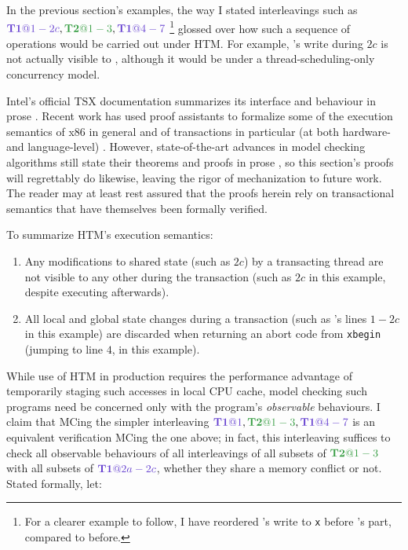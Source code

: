 In the previous section's examples,
the way I stated interleavings such as $\tiat{1-2c}, \tjat{1-3}, \tiat{4-7}$%
\footnote{For a clearer example to follow, I have reordered \ti's write to {\tt x} before \tj's part, compared to before.}
glossed over
how such a sequence of operations would be carried out under HTM.
For example, \ti's write during $2c$ is not actually visible to \tj,
although it would be under a thread-scheduling-only concurrency model.

Intel's official TSX documentation summarizes its interface and behaviour in prose \cite{intel-tsx-overview}.
Recent work has used proof assistants to formalize some of the execution semantics
of x86 in general \cite{x86-semantics}
and of transactions in particular (at both hardware- and language-level) \cite{relaxed-transactions-pldi}.
However, state-of-the-art advances in model checking algorithms
still state their theorems and proofs in prose \cite{bpor,optimal-dpor,tsopso,satcheck,mcr,quicksand,rcmc},
so this section's proofs will regrettably do likewise,
leaving the rigor of mechanization to future work.
The reader may at least rest assured that the proofs herein
rely on transactional semantics that have themselves been formally verified.

To summarize HTM's execution semantics:

\begin{enumerate}
	\item Any modifications to shared state (such as $2c$) by a transacting thread
		are not visible to any other during the transaction
		(such as $2c$ in this example, despite \tj executing afterwards).
	\item All local and global state changes during a transaction
		(such as \ti's lines $1-2c$ in this example)
		are discarded when returning an abort code from {\tt xbegin}
		(jumping to line $4$, in this example).
\end{enumerate}

While use of HTM in production requires the performance advantage
of temporarily staging such accesses in local CPU cache,
model checking such programs need be concerned only with the program's {\em observable} behaviours.
I claim that MCing the simpler interleaving $\tiat{1}, \tjat{1-3}, \tiat{4-7}$
is an equivalent verification  MCing the one above;
in fact, this interleaving suffices to check
all observable behaviours
of all interleavings
of all subsets of $\tjat{1-3}$
with all subsets of $\tiat{2a-2c}$,
whether they share a memory conflict or not.
Stated formally, let:

